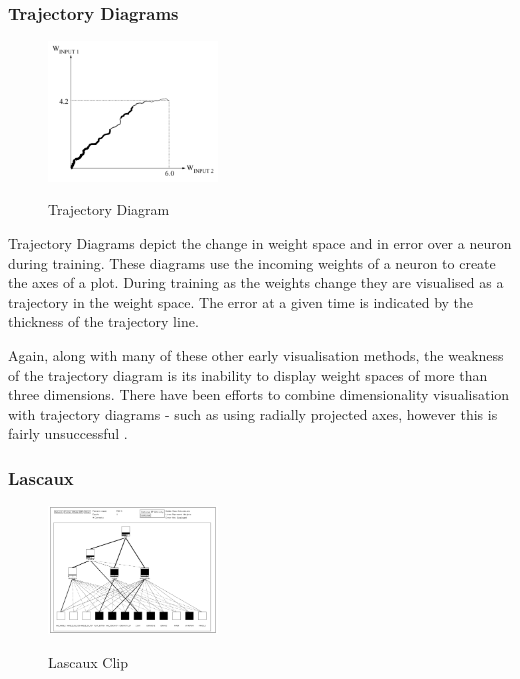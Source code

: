 \documentclass[a4paper,11pt,titlepage]{article}
\begin{document}
\subsubsection{Trajectory Diagrams}
		
 	\begin{figure}[H]
    			\centering	
			{{\includegraphics[width=0.4\textwidth]
    				{img/craven_trajectory.png} 
    			}}%
    			\caption{Trajectory Diagram}%
    		\label{fig:bond}
	\end{figure} 
 		
		Trajectory Diagrams \cite{Wejchert1990} depict the change in weight space and in error over a neuron during training. These diagrams use the incoming weights of a neuron to create the axes of a plot. During training as the weights change they are visualised as a trajectory in the weight space. The error at a given time is indicated by the thickness of the trajectory line.
		\par 	
		Again, along with many of these other early visualisation methods, the weakness of the trajectory diagram is its inability to display weight spaces of more than three dimensions. There have been efforts to combine dimensionality visualisation with trajectory diagrams - such as using radially projected axes, however this is fairly unsuccessful \cite{Craven1992}. 
		\par 
		
\subsubsection{Lascaux}
		
	\begin{figure}[H]
    			\centering	
			{{\includegraphics[width=0.4\textwidth]
    				{img/craven_weights.png} 
    			}}%
    			\caption{Lascaux Clip}%
    		\label{fig:lascaux}
	\end{figure}  		
 		
\end{document}
